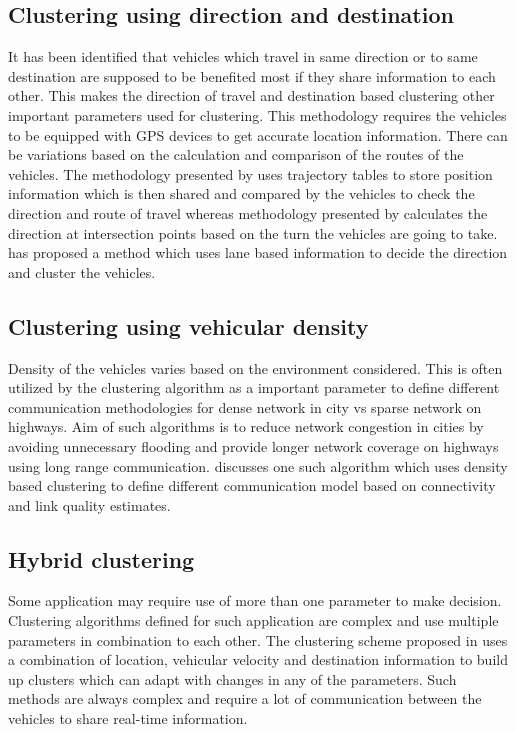 \documentclass[]{ccs-thesis}
\begin{document}
\subsection{Clustering using direction and destination}

It has been identified that vehicles which travel in same direction or to same destination are supposed to be benefited
most if they share information to each other. This makes the direction of travel and destination based clustering other
important parameters used for clustering. This methodology requires the vehicles to be equipped with \ac{GPS} devices to
get accurate location information. There can be variations based on the calculation and comparison of the routes of the
vehicles. The methodology presented by \textcite{6685518} uses trajectory tables to store position information which is
then shared and compared by the vehicles to check the direction and route of travel whereas methodology presented
by \textcite{5416361} calculates the direction at intersection points based on the turn the vehicles are going to take.
\textcite{5735785} has proposed a method which uses lane based information to decide the direction and cluster the vehicles.

\subsection{Clustering using vehicular density}

Density of the vehicles varies based on the environment considered. This is often utilized by the clustering
algorithm as a important parameter to define different communication methodologies for dense network in city vs
sparse network on highways. Aim of such algorithms is to reduce network congestion in cities by avoiding unnecessary
flooding and provide longer network coverage on highways using long range communication. \textcite{4976256} discusses
one such algorithm which uses density based clustering to define different communication model based on connectivity and
link quality estimates.

\subsection{Hybrid clustering}

Some application may require use of more than one parameter to make decision. Clustering algorithms defined for such
application are complex and use multiple parameters in combination to each other. The clustering scheme proposed
in \cite{6077004} uses a combination of location, vehicular velocity and destination information to build up clusters
which can adapt with changes in any of the parameters. Such methods are always complex and require a lot of communication
between the vehicles to share real-time information.
\end{document}
